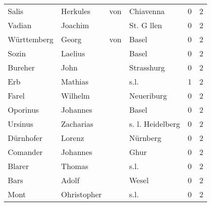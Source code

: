\documentclass[10pt,a4paper,landscape]{article}
\begin{document}
\begin{longtable}{llllrr}
                    Salis &                           Herkules &         von &                                   Chiavenna &          0 &         2 \\
                   Vadian &                            Joachim &             &                                  St. G llen &          0 &         2 \\
              Württemberg &                              Georg &         von &                                       Basel &          0 &         2 \\
                    Sozin &                            Laelius &             &                                       Basel &          0 &         2 \\
                  Bureher &                               John &             &                                  Strasshurg &          0 &         2 \\
                      Erb &                            Mathias &             &                                        s.l. &          1 &         2 \\
                    Farel &                            Wilhelm &             &                                  Neueriburg &          0 &         2 \\
                 Oporinus &                           Johannes &             &                                       Basel &          0 &         2 \\
                  Ursinus &                          Zacharias &             &                            s. l. Heidelberg &          0 &         2 \\
                Dürnhofer &                             Lorenz &             &                                    Nürnberg &          0 &         2 \\
                 Comander &                           Johannes &             &                                        Ghur &          0 &         2 \\
                   Blarer &                             Thomas &             &                                        s.l. &          0 &         2 \\
                     Bars &                              Adolf &             &                                       Wesel &          0 &         2 \\
                     Mont &                        Ohristopher &             &                                        s.l. &          0 &         2 \\

\end{longtable}
\end{document}
